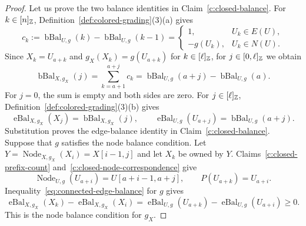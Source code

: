 \begin{proof}
 Let us prove the two balance identities in Claim~\ref{c:closed-balance}.
For $k\in[n]_{\mathbb Z}$, Definition~\ref{def:colored-grading}(3)(a) gives
\[
 c_k:=\operatorname{bBal}_{U,g}(k)-\operatorname{bBal}_{U,g}(k-1)
 =\begin{cases}1,&U_k\in E(U),\\-g(U_k),&U_k\in N(U).\end{cases}
\]
Since $X_k=U_{a+k}$ and $g_X(X_k)=g(U_{a+k})$ for $k\in[\ell]_{\mathbb Z}$, for $j\in[0,\ell]_{\mathbb Z}$ we obtain
\[
 \operatorname{bBal}_{X,g_X}(j)=\sum_{k=a+1}^{a+j}c_k
 =\operatorname{bBal}_{U,g}(a+j)-\operatorname{bBal}_{U,g}(a).
\]
For $j=0$, the sum is empty and both sides are zero.
For $j\in[\ell]_{\mathbb Z}$, Definition~\ref{def:colored-grading}(3)(b) gives
\[
 \operatorname{eBal}_{X,g_X}(X_j)=\operatorname{bBal}_{X,g_X}(j),\qquad
 \operatorname{eBal}_{U,g}(U_{a+j})=\operatorname{bBal}_{U,g}(a+j).
\]
Substitution proves the edge-balance identity in Claim~\ref{c:closed-balance}.
Suppose that $g$ satisfies the node balance condition.
Let $Y=\operatorname{Node}_{X,g_X}(X_i)=X[i-1,j]$ and let $X_k$ be owned by $Y$.
Claims~\ref{c:closed-prefix-count} and~\ref{c:closed-node-correspondence} give
\[
 \operatorname{Node}_{U,g}(U_{a+i})=U[a+i-1,a+j],\qquad P(U_{a+k})=U_{a+i}.
\]
Inequality~\eqref{eq:connected-edge-balance} for $g$ gives
\[
 \operatorname{eBal}_{X,g_X}(X_k)-\operatorname{eBal}_{X,g_X}(X_i)
 =\operatorname{eBal}_{U,g}(U_{a+k})-\operatorname{eBal}_{U,g}(U_{a+i})\ge0.
\]
This is the node balance condition for $g_X$.
\end{proof}


